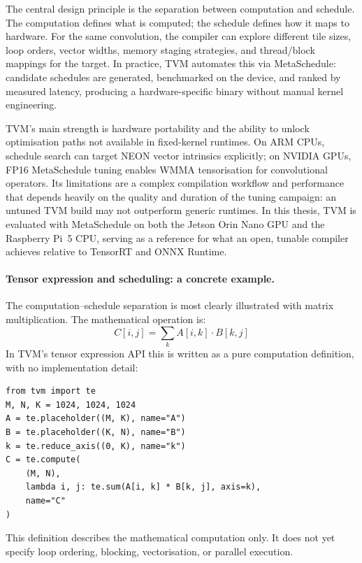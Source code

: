 \documentclass[12pt,a4paper]{report}
\begin{document}
The central design principle is the separation between computation and schedule.
The computation defines what is computed; the schedule defines how it maps to hardware.
For the same convolution, the compiler can explore different tile sizes, loop orders, vector widths, memory staging
strategies, and thread/block mappings for the target.
In practice, TVM automates this via MetaSchedule: candidate schedules are generated, benchmarked on the device,
and ranked by measured latency, producing a hardware-specific binary without manual kernel engineering.

TVM's main strength is hardware portability and the ability to unlock optimisation paths not available in
fixed-kernel runtimes.
On ARM CPUs, schedule search can target NEON vector intrinsics explicitly; on NVIDIA GPUs, FP16 MetaSchedule tuning
enables WMMA tensorisation for convolutional operators.
Its limitations are a complex compilation workflow and performance that depends heavily on the quality and duration
of the tuning campaign: an untuned TVM build may not outperform generic runtimes.
In this thesis, TVM is evaluated with MetaSchedule on both the Jetson Orin Nano GPU and the Raspberry Pi~5 CPU,
serving as a reference for what an open, tunable compiler achieves relative to TensorRT and ONNX Runtime.

\paragraph{Tensor expression and scheduling: a concrete example.}
The computation--schedule separation is most clearly illustrated with matrix multiplication.
The mathematical operation is:
\begin{equation}
C[i,j] = \sum_k A[i,k] \cdot B[k,j]
\end{equation}
In TVM's tensor expression API this is written as a pure computation definition, with no implementation
detail:
\begin{verbatim}
from tvm import te
M, N, K = 1024, 1024, 1024
A = te.placeholder((M, K), name="A")
B = te.placeholder((K, N), name="B")
k = te.reduce_axis((0, K), name="k")
C = te.compute(
    (M, N),
    lambda i, j: te.sum(A[i, k] * B[k, j], axis=k),
    name="C"
)
\end{verbatim}
This definition describes the mathematical computation only.
It does not yet specify loop ordering, blocking, vectorisation, or parallel execution.
\end{document}
